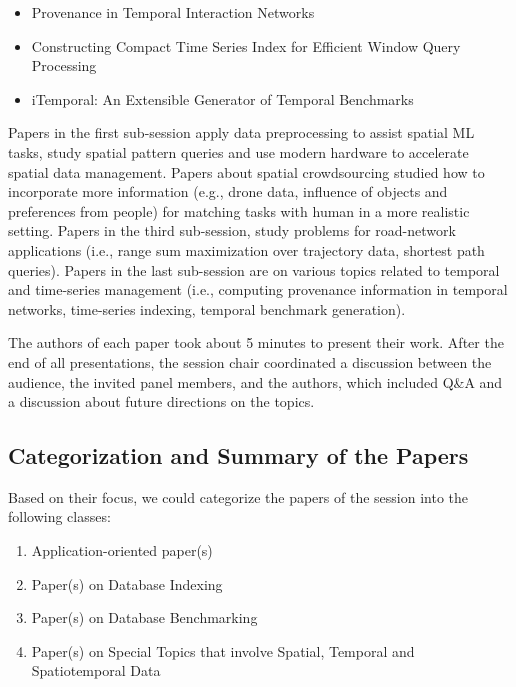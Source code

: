 \documentclass[11pt,dvipdfm]{article}
\begin{document}
\begin{itemize}
\item
Provenance in Temporal Interaction Networks
\item
Constructing Compact Time Series Index for Efficient Window Query Processing
\item
iTemporal: An Extensible Generator of Temporal Benchmarks
\end{itemize}

Papers in the first sub-session apply data preprocessing to assist spatial ML tasks, study spatial pattern queries and use modern hardware to accelerate spatial data management.
Papers about spatial crowdsourcing  studied how to incorporate more information (e.g., drone data, influence of objects and preferences from people) for matching tasks with human in a more realistic setting. Papers in the third sub-session, study problems for road-network applications (i.e., 
range sum maximization over trajectory data, shortest path queries).
Papers in the last sub-session are on various topics related to temporal and time-series management (i.e., computing provenance information in temporal networks, time-series indexing, temporal benchmark generation).


The authors of each paper took about 5 minutes to present their work. After the end of all presentations, the session chair coordinated a discussion between the audience, the invited panel members, and the authors, which included Q\&A and a discussion about future directions on the topics. 

\subsection{Categorization and Summary of the Papers}
Based on their focus, we could categorize the papers of the session into the following classes:
\begin{enumerate}
    \item Application-oriented paper(s)
    \item Paper(s) on Database Indexing 
    \item Paper(s) on Database Benchmarking 
    \item Paper(s) on Special Topics that involve Spatial, Temporal and Spatiotemporal Data
\end{enumerate}
\end{document}
